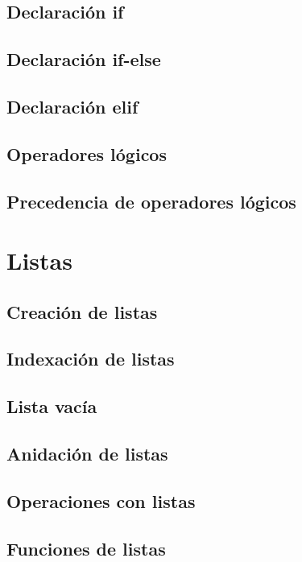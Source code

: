 \documentclass{article}
\begin{document}
\subsection{Declaración if}

\subsection{Declaración if-else}

\subsection{Declaración elif}

\subsection{Operadores lógicos}

\subsection{Precedencia de operadores lógicos}

\section{Listas}

\subsection{Creación de listas}

\subsection{Indexación de listas}

\subsection{Lista vacía}

\subsection{Anidación de listas}

\subsection{Operaciones con listas}

\subsection{Funciones de listas}
\end{document}
